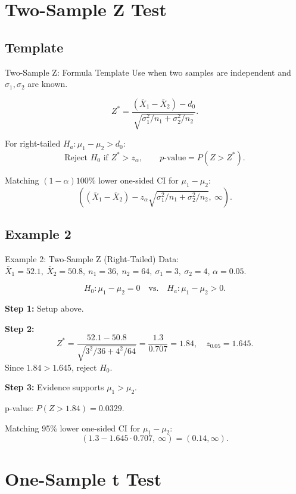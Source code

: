 \documentclass[aspectratio=169]{beamer}
\begin{document}
\section{Two-Sample Z Test}

\subsection{Template}
\begin{frame}{Two-Sample Z: Formula Template}
  Use when two samples are independent and \(\sigma_1,\sigma_2\) are known.

  \[
    Z^*=\frac{(\bar X_1-\bar X_2)-d_0}{\sqrt{\sigma_1^2/n_1+\sigma_2^2/n_2}}.
  \]

  For right-tailed \(H_a:\mu_1-\mu_2>d_0\):
  \[
    \text{Reject }H_0\text{ if }Z^*>z_{\alpha},
    \qquad
    p\text{-value}=P(Z>Z^*).
  \]

  Matching \((1-\alpha)100\%\) lower one-sided CI for \(\mu_1-\mu_2\):
  \[
    \left((\bar X_1-\bar X_2)-z_{\alpha}\sqrt{\sigma_1^2/n_1+\sigma_2^2/n_2},\ \infty\right).
  \]
\end{frame}

\subsection{Example 2}
\begin{frame}{Example 2: Two-Sample Z (Right-Tailed)}
  Data: \(\bar X_1=52.1,\ \bar X_2=50.8,\ n_1=36,\ n_2=64,\ \sigma_1=3,\ \sigma_2=4\), \(\alpha=0.05\).

  \[
    H_0:\mu_1-\mu_2=0
    \quad\text{vs.}\quad
    H_a:\mu_1-\mu_2>0.
  \]

  \textbf{Step 1:} Setup above.

  \textbf{Step 2:}
  \[
    Z^*=\frac{52.1-50.8}{\sqrt{3^2/36+4^2/64}}
    =\frac{1.3}{0.707}=1.84,
    \quad
    z_{0.05}=1.645.
  \]
  Since \(1.84>1.645\), reject \(H_0\).

  \textbf{Step 3:} Evidence supports \(\mu_1>\mu_2\).

  \vspace{1mm}
  p-value: \(P(Z>1.84)=0.0329\).

  Matching 95\% lower one-sided CI for \(\mu_1-\mu_2\):
  \[
    (1.3-1.645\cdot 0.707,\ \infty)=(0.14,\infty).
  \]
\end{frame}

\section{One-Sample t Test}
\end{document}
